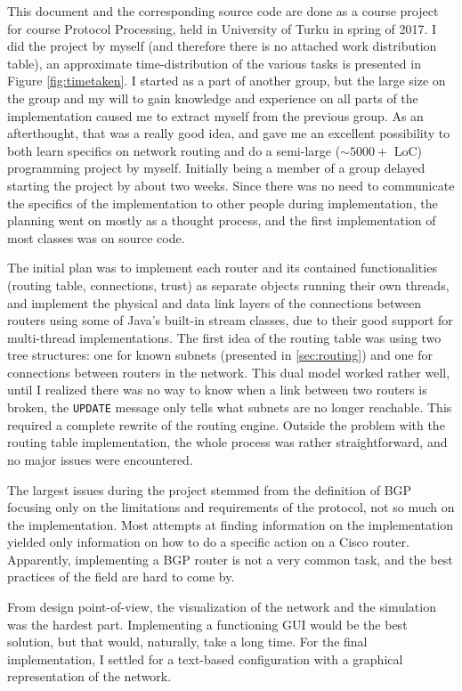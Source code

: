 \documentclass[11pt,a4paper,titlepage]{report}
\begin{document}
This document and the corresponding source code are done as a course project for course Protocol Processing, held in University of Turku in spring of 2017. I did the project by myself (and therefore there is no attached work distribution table), an approximate time-distribution of the various tasks is presented in Figure \ref{fig:timetaken}. I started as a part of another group, but the large size on the group and my will to gain knowledge and experience on all parts of the implementation caused me to extract myself from the previous group. As an afterthought, that was a really good idea, and gave me an excellent possibility to both learn specifics on network routing and do a semi-large ($\sim 5000+$ LoC) programming project by myself. Initially being a member of a group delayed starting the project by about two weeks. Since there was no need to communicate the specifics of the implementation to other people during implementation, the planning went on mostly as a thought process, and the first implementation of most classes was on source code.

The initial plan was to implement each router and its contained functionalities (routing table, connections, trust) as separate objects running their own threads, and implement the physical and data link layers of the connections between routers using some of Java's built-in stream classes, due to their good support for multi-thread implementations. The first idea of the routing table was using two tree structures: one for known subnets (presented in \ref{sec:routing}) and one for connections between routers in the network. This dual model worked rather well, until I realized there was no way to know when a link between two routers is broken, the \texttt{UPDATE} message only tells what subnets are no longer reachable. This required a complete rewrite of the routing engine. Outside the problem with the routing table implementation, the whole process was rather straightforward, and no major issues were encountered.

The largest issues during the project stemmed from the definition of BGP \cite{RFC4271} focusing only on the limitations and requirements of the protocol, not so much on the implementation. Most attempts at finding information on the implementation yielded only information on how to do a specific action on a Cisco router. Apparently, implementing a BGP router is not a very common task, and the best practices of the field are hard to come by.

From design point-of-view, the visualization of the network and the simulation was the hardest part. Implementing a functioning GUI would be the best solution, but that would, naturally, take a long time. For the final implementation, I settled for a text-based configuration with a graphical representation of the network.
\end{document}
